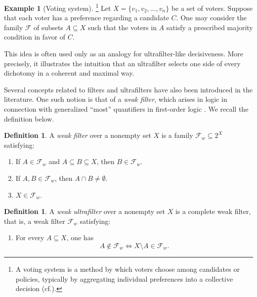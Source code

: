 \documentclass[10pt]{book}
\theoremstyle{definition}
\newtheorem{definition}[theorem]{Definition}
\newtheorem{example}[theorem]{Example}
\begin{document}
\begin{example}[Voting system]
\footnote{A voting system is a method by which voters choose among candidates or policies, typically by aggregating individual preferences into a collective decision (cf.\cite{grossi2021lecture,babaioff2016mechanism,ciesielski2021some,machover2014mathematical}).}
Let \(X=\{v_1,v_2,\dots,v_n\}\) be a set of voters.  
Suppose that each voter has a preference regarding a candidate \(C\).  
One may consider the family \(\mathcal{F}\) of subsets \(A\subseteq X\) such that the voters in \(A\) satisfy a prescribed majority condition in favor of \(C\).

This idea is often used only as an analogy for ultrafilter-like decisiveness.  
More precisely, it illustrates the intuition that an ultrafilter selects one side of every dichotomy in a coherent and maximal way.
\end{example}

Several concepts related to filters and ultrafilters have also been introduced in the literature.  
One such notion is that of a \emph{weak filter}, which arises in logic in connection with generalized ``most'' quantifiers in first-order logic \cite{koutras2023weak,koutras2017reconstruction,schlechta2007analysis,schlechta1997reduction,koutras2014many,schlechta1997filters,schlechta1995defaults,askounis2016knowledge,koutras2014modal,castricato2021towards}.  
We recall the definition below.

\begin{definition}\cite{koutras2023weak}
A \emph{weak filter} over a nonempty set \(X\) is a family \(\mathcal{F}_w\subseteq 2^X\) satisfying:
\begin{enumerate}
    \item[(WFB0)\(_w\)] If \(A\in\mathcal{F}_w\) and \(A\subseteq B\subseteq X\), then \(B\in\mathcal{F}_w\).
    \item[(WFB1)\(_w\)] If \(A,B\in\mathcal{F}_w\), then \(A\cap B\neq\emptyset\).
    \item[(WFB2)\(_w\)] \(X\in\mathcal{F}_w\).
\end{enumerate}
\end{definition}

\begin{definition}\cite{koutras2023weak}
A \emph{weak ultrafilter} over a nonempty set \(X\) is a complete weak filter, that is, a weak filter \(\mathcal{F}_w\) satisfying:
\begin{enumerate}
    \item[(WFB3)\(_w\)] For every \(A\subseteq X\), one has
    \[
    A\notin\mathcal{F}_w \iff X\setminus A\in\mathcal{F}_w.
    \]
\end{enumerate}
\end{definition}
\end{document}
